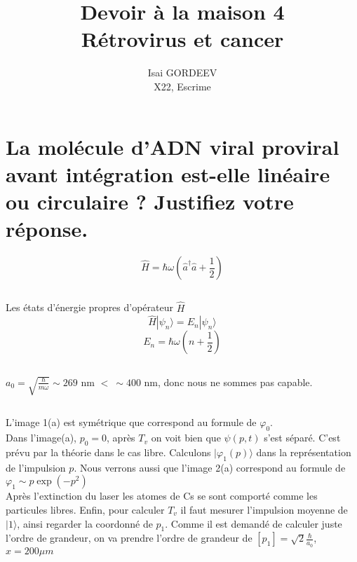 \documentclass[a4paper,12pt]{article}
\title{Devoir à la maison 4 \\
 Rétrovirus et cancer}
\author{Isai GORDEEV\\
X22, Escrime}
\begin{document}
\maketitle



\section{La molécule d’ADN viral proviral avant intégration est-elle linéaire ou circulaire ? Justifiez votre réponse.}
$$\hat H =  \hbar\omega(\hat a^{\dagger }\hat a + \frac12)$$
\subsection{}
Les états d'énergie propres d'opérateur $\hat H$
\begin{equation}\label{key}
	\hat H |\psi_n\rangle = E_n |\psi_n\rangle
\end{equation}
$$E_n = \hbar\omega(n+\frac 1 2) $$

\subsection{}

$a_0 = \displaystyle\sqrt{\frac{\hbar}{m\omega}} \sim 269 $ nm $ <\ \sim400$ nm, donc nous ne sommes pas capable. 

\subsection{}

L'image 1(a) est symétrique que correspond au formule de $\varphi_0$.\\

Dans l'image(a), $p_0 = 0$, après $T_v$ on voit bien que $\psi(p, t)$ s'est séparé.
C'est prévu par la théorie dans le cas libre. Calculons $ |\varphi_1(p)\rangle$ dans la représentation de l'impulsion $p$. 
Nous verrons aussi que l'image 2(a) correspond au formule de $\varphi_1 \sim p\exp(-p^2)$ \\ 







Après l'extinction du laser les atomes de Cs se sont comporté comme les particules libres. 
Enfin, pour calculer $T_v$ il faut mesurer l'impulsion moyenne de $|1\rangle$, ainsi regarder la coordonné de $p_1$. Comme il est demandé de calculer juste l'ordre de grandeur, on va prendre l'ordre de grandeur de $[p_1] = \sqrt 2\frac{\hbar}{a_0}$, $x = 200\mu m$
\end{document}
